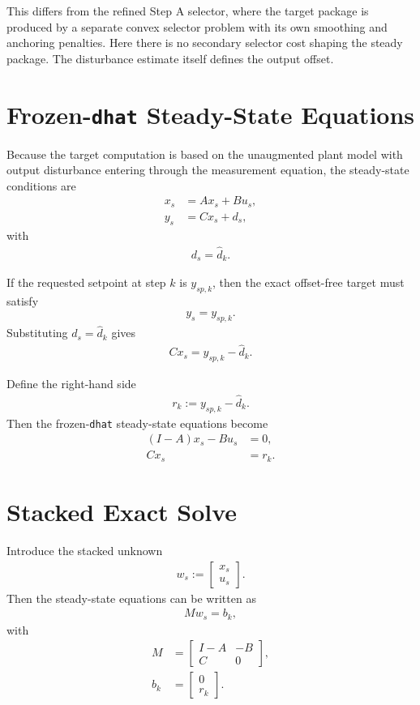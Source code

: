\documentclass[11pt]{article}
\begin{document}
This differs from the refined Step A selector, where the target package is produced by a separate convex selector problem with its own smoothing and anchoring penalties. Here there is no secondary selector cost shaping the steady package. The disturbance estimate itself defines the output offset.

\section{Frozen-\texttt{dhat} Steady-State Equations}

Because the target computation is based on the unaugmented plant model with output disturbance entering through the measurement equation, the steady-state conditions are
\begin{align}
x_s &= A x_s + B u_s, \\
y_s &= C x_s + d_s,
\end{align}
with
\begin{align}
d_s = \hat d_k.
\end{align}

If the requested setpoint at step $k$ is $y_{sp,k}$, then the exact offset-free target must satisfy
\begin{align}
y_s = y_{sp,k}.
\end{align}
Substituting $d_s = \hat d_k$ gives
\begin{align}
C x_s = y_{sp,k} - \hat d_k.
\end{align}

Define the right-hand side
\begin{align}
r_k := y_{sp,k} - \hat d_k.
\end{align}
Then the frozen-\texttt{dhat} steady-state equations become
\begin{align}
(I-A)x_s - B u_s &= 0, \\
C x_s &= r_k.
\end{align}

\section{Stacked Exact Solve}

Introduce the stacked unknown
\begin{align}
w_s :=
\begin{bmatrix}
x_s \\
u_s
\end{bmatrix}.
\end{align}
Then the steady-state equations can be written as
\begin{align}
M w_s = b_k,
\end{align}
with
\begin{align}
M &=
\begin{bmatrix}
I-A & -B \\
C   & 0
\end{bmatrix}, \\
b_k &=
\begin{bmatrix}
0 \\
r_k
\end{bmatrix}.
\end{align}
\end{document}
